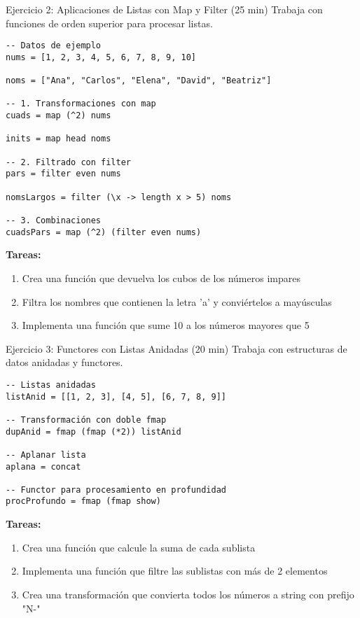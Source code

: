 \documentclass[12pt]{article}
\begin{document}
\begin{ejercicio}{Ejercicio 2: Aplicaciones de Listas con Map y Filter (25 min)}
Trabaja con funciones de orden superior para procesar listas.

\begin{lstlisting}[style=haskell]
-- Datos de ejemplo
nums = [1, 2, 3, 4, 5, 6, 7, 8, 9, 10]

noms = ["Ana", "Carlos", "Elena", "David", "Beatriz"]

-- 1. Transformaciones con map
cuads = map (^2) nums

inits = map head noms

-- 2. Filtrado con filter
pars = filter even nums

nomsLargos = filter (\x -> length x > 5) noms

-- 3. Combinaciones
cuadsPars = map (^2) (filter even nums)
\end{lstlisting}

\textbf{Tareas:}
\begin{enumerate}
\item Crea una función que devuelva los cubos de los números impares
\item Filtra los nombres que contienen la letra 'a' y conviértelos a mayúsculas
\item Implementa una función que sume 10 a los números mayores que 5
\end{enumerate}
\end{ejercicio}

\begin{ejercicio}{Ejercicio 3: Functores con Listas Anidadas (20 min)}
Trabaja con estructuras de datos anidadas y functores.

\begin{lstlisting}[style=haskell]
-- Listas anidadas
listAnid = [[1, 2, 3], [4, 5], [6, 7, 8, 9]]

-- Transformación con doble fmap
dupAnid = fmap (fmap (*2)) listAnid

-- Aplanar lista
aplana = concat

-- Functor para procesamiento en profundidad
procProfundo = fmap (fmap show)
\end{lstlisting}

\textbf{Tareas:}
\begin{enumerate}
\item Crea una función que calcule la suma de cada sublista
\item Implementa una función que filtre las sublistas con más de 2 elementos
\item Crea una transformación que convierta todos los números a string con prefijo "N-"
\end{enumerate}
\end{ejercicio}
\end{document}
